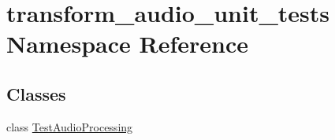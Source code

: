\hypertarget{namespacetransform__audio__unit__tests}{\section{transform\-\_\-audio\-\_\-unit\-\_\-tests Namespace Reference}
\label{namespacetransform__audio__unit__tests}
}
\subsection*{Classes}
\begin{DoxyCompactItemize}
\item 
class \hyperlink{classtransform__audio__unit__tests_1_1TestAudioProcessing}{Test\-Audio\-Processing}
\end{DoxyCompactItemize}
